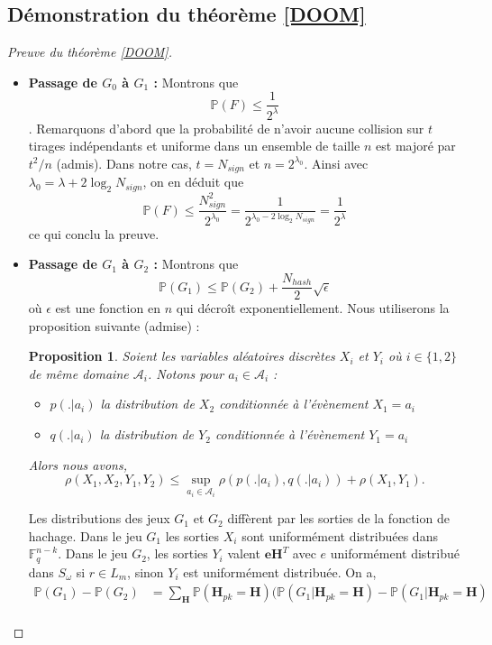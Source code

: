 \documentclass[12pt]{article}
\theoremstyle{plain}
\newtheorem{propo}[thm]{Proposition}
\newcommand{\F}{\mathbb{F}}
\newcommand{\e}{\mathbf{e}}
\begin{document}
\begin{appendix}
\subsection*{Démonstration du théorème \ref{DOOM}}
\begin{proof}[Preuve du théorème \ref{DOOM}] \
\begin{itemize}
\item \textbf{Passage de $G_0$ à $G_1$ : } Montrons que $$\mathbb{P}(F) \leq \frac{1}{2^\lambda}$$.
Remarquons d'abord que la probabilité de n'avoir aucune collision sur $t$ tirages indépendants et uniforme dans un ensemble de taille $n$ est majoré par $t^2/n$ (admis). Dans notre cas, $t=N_{sign}$ et $n=2^{\lambda_0}$. Ainsi avec $\lambda_0 = \lambda +2 \log_2N_{sign}$, on en déduit que 
$$ \mathbb{P}(F) \leq \frac{N^2_{sign}}{2^{\lambda_0}}=\frac{1}{2^{\lambda_0 -2 \log_2N_{sign}}} =\frac{1}{2^\lambda}$$ ce qui conclu la preuve.
\item \textbf{Passage de $G_1$ à $G_2$ : } Montrons que $$ \mathbb{P}(G_1) \leq  \mathbb{P}(G_2) +  \frac{N_{hash}}{2}\sqrt{\epsilon} $$
où $\epsilon$ est une fonction en $n$ qui décroît exponentiellement.
Nous utiliserons la proposition suivante (admise) :
\begin{propo} Soient les variables aléatoires discrètes $X_i$ et $Y_i$ où $i \in \{1,2\}$ de même domaine $\mathcal{A}_i$. Notons pour $a_i \in \mathcal{A}_i$ :
	\begin{itemize}
	\item $p(.|a_i)$ la distribution de $X_2$ conditionnée à l'évènement $X_1 = a_i$
	\item $q(.|a_i)$ la distribution de $Y_2$ conditionnée à l'évènement $Y_1 = a_i$
	\end{itemize}
Alors nous avons,
$$\rho(X_1,X_2,Y_1,Y_2) \leq \sup_{a_i \in \mathcal{A}_i}\rho(p(.|a_i),q(.|a_i)) + \rho(X_1,Y_1).$$
\end{propo}
Les distributions des jeux $G_1$ et $G_2$ diffèrent par les sorties de la fonction de hachage. Dans le jeu $G_1$ les sorties $X_i$ sont uniformément distribuées dans $\F_q^{n-k}$. Dans le jeu  $G_2$, les sorties $Y_i$ valent $\e\mathbf{H}^T$ avec $e$ uniformément distribué dans $S_{\omega}$ si $r\in L_m$, sinon $Y_i$ est uniformément distribuée.  On a,
\begin{equation}
\begin{split}
\mathbb{P}(G_1) - \mathbb{P}(G_2) &= \sum_{\mathbf{H}}\mathbb{P}(\mathbf{H}_{pk}=\mathbf{H})(\mathbb{P}(G_1|\mathbf{H}_{pk}=\mathbf{H})-\mathbb{P}(G_1|\mathbf{H}_{pk}=\mathbf{H}) \\

\end{split}
\end{equation}
\end{itemize}
\end{proof}
\end{appendix}
\end{document}
